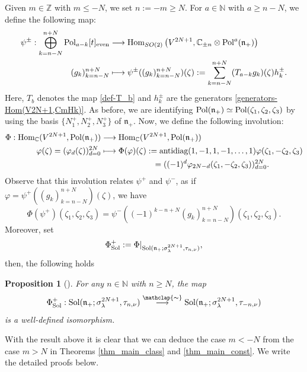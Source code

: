 \documentclass[12pt, pdflatex, a4paper]{article}
\theoremstyle{plain}
\newtheorem{prop}[thm]{Proposition}
\theoremstyle{definition}
\def\antidiag{\text{\normalfont{antidiag}}}
\def\C{{\mathbb C}}
\def\Hom{\text{\normalfont{Hom}}}
\def\N{{\mathbb N}}
\def\n{\mathfrak{n}}
\def\Pol{\text{\normalfont{Pol}}}
\def\Sol{\text{\normalfont{Sol}}}
\def\Z{{\mathbb Z}}
\newcommand\arrowsimeq{\stackrel{\mathclap{\thicksim}}{\longrightarrow}}
\begin{document}
Given $m \in \Z$ with $m \leq -N$, we set $n := -m \geq N$. For $a \in \N$ with $a \geq n-N$, we define the following map:
\begin{align*}
\psi^\pm: \bigoplus_{k=n-N}^{n+N}\Pol_{a-k}[t]_\text{even} & \longrightarrow \Hom_{SO(2)}\left(V^{2N+1}, \C_{\pm n}\otimes \Pol^a(\n_+)\right)\\
(g_k)_{k=n-N}^{n+N} & \longmapsto \psi^\pm((g_k)_{k=n-N}^{n+N})(\zeta) :=  \sum_{k=n-N}^{n+N} (T_{a-k}g_k)(\zeta)h_k^\pm.
\end{align*}
Here, $T_b$ denotes the map \eqref{def-T_b} and $h_k^\pm$ are the generators \eqref{generators-Hom(V2N+1,CmHk)}. As before, we are identifying $\Pol(\n_+) \simeq \Pol(\zeta_1, \zeta_2, \zeta_3)$ by using the basis $\{N_1^+, N_2^+, N_3^+\}$ of $\n_+$.
Now, we define the following involution:
\begin{align*}
\Phi: \Hom_\C(V^{2N+1}, \Pol(\n_+))& \longrightarrow \Hom_\C(V^{2N+1}, \Pol(\n_+))\\
\varphi(\zeta) = (\varphi_d(\zeta))_{d=0}^{2N} &\longmapsto \Phi(\varphi)(\zeta):= \antidiag(1, -1, 1, -1, \ldots, 1)\varphi(\zeta_1,-\zeta_2, \zeta_3)\\
& \hspace{2.25cm} = ((-1)^d\varphi_{2N-d}(\zeta_1, -\zeta_2, \zeta_3))_{d=0}^{2N}.
\end{align*}
Observe that this involution relates $\psi^+$ and $\psi^-$, as if $\varphi = \psi^+((g_k)_{k = n-N}^{n+N})(\zeta)$, we have
\begin{equation*}
\Phi(\psi^+)(\zeta_1, \zeta_2, \zeta_3) = \psi^-((-1)^{k-n+N}(g_k)_{k=n-N}^{n+N})(\zeta_1, \zeta_2, \zeta_3).
\end{equation*}
Moreover, set
\begin{equation*}
\Phi_\text{Sol}^+ := \Phi\rvert_{\Sol(\n_+; \sigma_\lambda^{2N+1}, \tau_{n, \nu})},
\end{equation*}
then, the following holds
\begin{prop}[{\cite[Prop. 8.2]{Per-Val24}}]\label{prop-duality} For any $n \in \N$ with $n \geq N$, the map
\begin{equation*}
\Phi_\text{\normalfont{Sol}}^+: \Sol(\n_+; \sigma_\lambda^{2N+1}, \tau_{n, \nu}) \arrowsimeq \Sol(\n_+; \sigma_\lambda^{2N+1}, \tau_{-n, \nu})
\end{equation*}
is a well-defined isomorphism.
\end{prop}

With the result above it is clear that we can deduce the case $m < -N$ from the case $m > N$ in Theorems \ref{thm_main_class} and \ref{thm_main_const}. We write the detailed proofs below.
\end{document}
